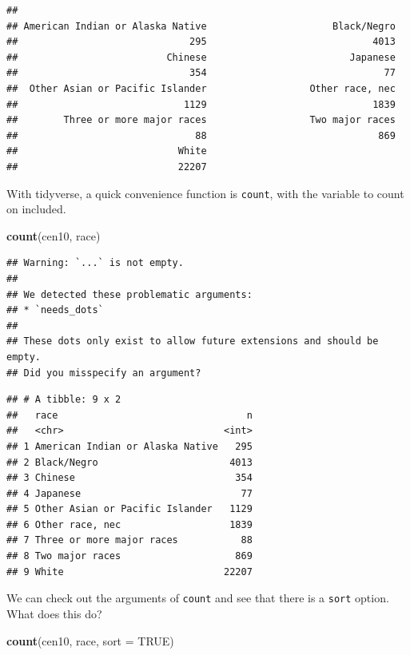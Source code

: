 \documentclass[
]{book}
\newenvironment{Shaded}{\begin{snugshade}}{\end{snugshade}}
\newcommand{\DataTypeTok}[1]{\textcolor[rgb]{0.13,0.29,0.53}{#1}}
\newcommand{\KeywordTok}[1]{\textcolor[rgb]{0.13,0.29,0.53}{\textbf{#1}}}
\newcommand{\NormalTok}[1]{#1}
\newcommand{\OtherTok}[1]{\textcolor[rgb]{0.56,0.35,0.01}{#1}}
\theoremstyle{definition}
\theoremstyle{definition}
\theoremstyle{definition}
\theoremstyle{definition}
\theoremstyle{remark}
\begin{document}
\begin{verbatim}
## 
## American Indian or Alaska Native                      Black/Negro 
##                              295                             4013 
##                          Chinese                         Japanese 
##                              354                               77 
##  Other Asian or Pacific Islander                  Other race, nec 
##                             1129                             1839 
##        Three or more major races                  Two major races 
##                               88                              869 
##                            White 
##                            22207
\end{verbatim}

With tidyverse, a quick convenience function is \texttt{count}, with the variable to count on included.

\begin{Shaded}
\begin{Highlighting}[]
\KeywordTok{count}\NormalTok{(cen10, race)}
\end{Highlighting}
\end{Shaded}

\begin{verbatim}
## Warning: `...` is not empty.
## 
## We detected these problematic arguments:
## * `needs_dots`
## 
## These dots only exist to allow future extensions and should be empty.
## Did you misspecify an argument?
\end{verbatim}

\begin{verbatim}
## # A tibble: 9 x 2
##   race                                 n
##   <chr>                            <int>
## 1 American Indian or Alaska Native   295
## 2 Black/Negro                       4013
## 3 Chinese                            354
## 4 Japanese                            77
## 5 Other Asian or Pacific Islander   1129
## 6 Other race, nec                   1839
## 7 Three or more major races           88
## 8 Two major races                    869
## 9 White                            22207
\end{verbatim}

We can check out the arguments of \texttt{count} and see that there is a \texttt{sort} option. What does this do?

\begin{Shaded}
\begin{Highlighting}[]
\KeywordTok{count}\NormalTok{(cen10, race, }\DataTypeTok{sort =} \OtherTok{TRUE}\NormalTok{)}
\end{Highlighting}
\end{Shaded}
\end{document}
